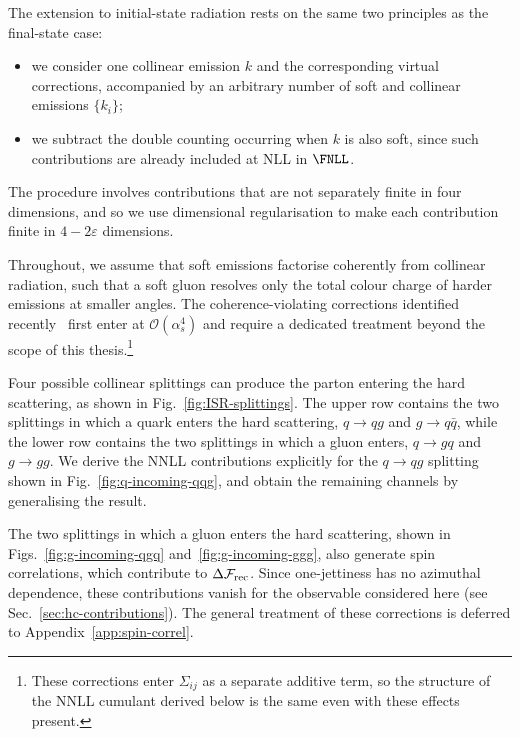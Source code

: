 The extension to initial-state radiation rests on the same two
principles as the final-state case:
\begin{itemize}
\item we consider one collinear emission $k$ and the corresponding virtual
  corrections, accompanied by an arbitrary
  number of soft and collinear emissions $\{k_i\}$;
\item we subtract the double counting occurring when $k$ is also soft,
since such contributions are already included at NLL in $\FNLL$.
\end{itemize}

The procedure involves contributions that are not separately
finite in four dimensions, and so we use dimensional regularisation to make
each contribution finite in $4-2\varepsilon$ dimensions. 

Throughout, we assume that soft emissions factorise coherently from
collinear radiation, such that a soft gluon resolves only the total colour
charge of harder emissions at smaller angles. The coherence-violating
corrections identified recently~\cite{Banfi:2025mra,Becher:2026kbr} first
enter at $\mathcal{O}(\alpha_s^4)$ and require a dedicated treatment beyond
the scope of this thesis.\footnote{These corrections enter $\Sigma_{ij}$ as
a separate additive term, so the structure of the NNLL cumulant derived
below is the same even with these effects present.}

Four possible collinear splittings can produce the parton entering the hard
scattering, as shown in Fig.~\ref{fig:ISR-splittings}. The upper row contains
the two splittings in which a quark enters the hard scattering,
$q\to qg$ and $g\to q\bar q$, while the lower row contains the two
splittings in which a gluon enters, $q\to gq$ and $g\to gg$. We derive
the NNLL contributions explicitly for the $q\to qg$ splitting shown in
Fig.~\ref{fig:q-incoming-qqg}, and obtain the remaining channels by
generalising the result.

The two splittings in which a gluon enters the hard scattering, shown in
Figs.~\ref{fig:g-incoming-qgq} and~\ref{fig:g-incoming-ggg}, also generate
spin correlations, which contribute to $\Delta\mathcal{F}_{\rm rec}$.
Since one-jettiness has no azimuthal dependence, these contributions
vanish for the observable considered here (see
Sec.~\ref{sec:hc-contributions}). The general treatment of these
corrections is deferred to Appendix~\ref{app:spin-correl}.

